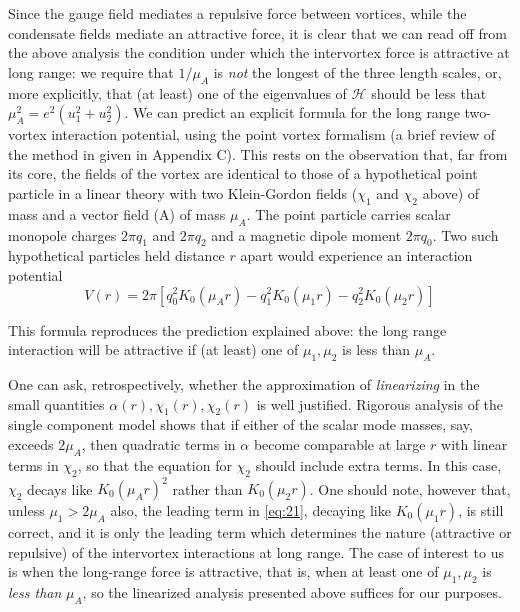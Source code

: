 Since the gauge field mediates a repulsive force between vortices, while the 
condensate fields mediate an attractive force, it is clear that we can read 
off from the above analysis the condition under which the intervortex force is 
attractive at long range: we require that \( 1/\mu_A \) is \emph{not} the 
longest of the three length scales, or, more explicitly, that (at least) one 
of the eigenvalues of \( \mathcal{H} \) should be less that 
\( \mu_A^2 = e^2(u_1^2 + u_2^2) \). We can predict an explicit formula for 
the long range two-vortex interaction potential, using the point vortex 
formalism\cite{bib:19} (a brief review of the method in given in Appendix C). 
This rests on the observation that, far from its core, the fields of the 
vortex are identical to those of a hypothetical point particle in a linear 
theory with two Klein-Gordon fields (\( \chi_1 \) and \( \chi_2 \) above) of 
mass and a vector field (A) of mass \( \mu_A \). The point particle carries 
scalar monopole charges \( 2\pi q_1 \) and \( 2\pi q_2 \) and a magnetic 
dipole moment \( 2\pi q_0 \). Two such hypothetical particles held distance 
\( r \) apart would experience an interaction potential
\begin{equation}
    V(r) = 2\pi\left[ q_0^2 K_0(\mu_A r) - q_1^2 K_0(\mu_1 r) - 
        q_2^2 K_0(\mu_2 r) \right]
    \label{eq:22}
\end{equation}

This formula reproduces the prediction explained above: the long range 
interaction will be attractive if (at least) one of \( \mu_1, \mu_2 \) is less 
than \( \mu_A \). 

One can ask, retrospectively, whether the approximation of \emph{linearizing} 
in the small quantities \( \alpha(r), \chi_1(r), \chi_2(r) \) is well 
justified. Rigorous analysis of the single component model\cite{bib:20} shows 
that if either of the scalar mode masses, say, exceeds \( 2\mu_A \), then 
quadratic terms in \( \alpha \) become comparable at large \( r \) with linear 
terms in \( \chi_2 \), so that the equation for \( \chi_2 \) should include 
extra terms. In this case, \( \chi_2 \) decays like \( K_0(\mu_A r)^2 \) 
rather than \( K_0(\mu_2 r) \). One should note, however that, unless
\( \mu_1 > 2\mu_A \) also, the leading term in \eqref{eq:21}, decaying like 
\( K_0(\mu_1 r) \), is still correct, and it is only the leading term which 
determines the nature (attractive or repulsive) of the intervortex 
interactions at long range. The case of interest to us is when the long-range 
force is attractive, that is, when at least one of \( \mu_1, \mu_2 \) is 
\emph{less than} \( \mu_A \), so the linearized analysis presented above 
suffices for our purposes.

